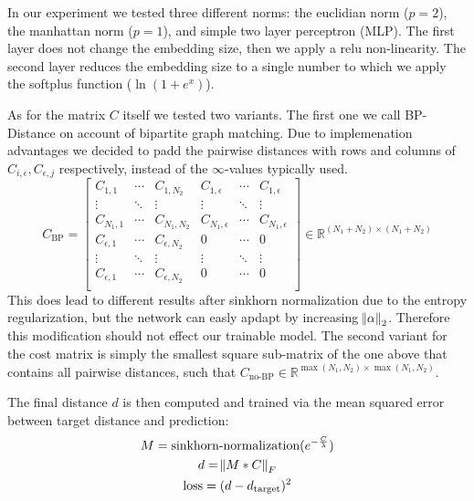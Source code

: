 In our experiment we tested three different norms: the euclidian norm ($p=2$), the manhattan norm ($p=1$), and simple two layer perceptron (MLP). The first layer does not change the embedding size, then we apply a relu non-linearity. The second layer reduces the embedding size to a single number to which we apply the softplus function ($\ln(1 + e^x)$).

As for the matrix $C$ itself we tested two variants. The first one we call BP-Distance on account of bipartite graph matching. Due to implemenation advantages we decided to padd the pairwise distances with rows and columns of $C_{i, \epsilon}, C_{\epsilon, j}$ respectively, instead of the $\infty$-values typically used.
\begin{equation}
     C_\text{BP}=
          \left[
          \begin{array}{ccc|ccc}
               C_{1,1} & \dotsi & C_{1, N_2} & C_{1, \epsilon} & \dotsi & C_{1, \epsilon} \\
               \vdots & \ddots & \vdots & \vdots & \ddots & \vdots \\
               C_{N_1, 1} & \dotsi & C_{N_1, N_2} & C_{N_1, \epsilon} & \dotsi & C_{N_1, \epsilon} \\
               \hline
               C_{\epsilon, 1} & \dotsi & C_{\epsilon, N_2} & 0 & \dotsi & 0 \\
               \vdots & \ddots & \vdots & \vdots & \ddots & \vdots \\
               C_{\epsilon, 1} & \dotsi & C_{\epsilon, N_2} & 0 & \dotsi & 0 \\
          \end{array}
          \right]
     \in \mathbb{R}^{(N_1 + N_2) \times (N_1 + N_2)}
\end{equation}
This does lead to different results after sinkhorn normalization due to the entropy regularization, but the network can easly apdapt by increasing $\norm{\alpha}_2$. Therefore this modification should not effect our trainable model. The second variant for the cost matrix is simply the smallest square sub-matrix of the one above that contains all pairwise distances, such that $C_\text{no-BP} \in \mathbb{R}^{\max({N_1, N_2}) \times \max({N_1, N_2})}$.

The final distance $d$ is then computed and trained via the mean squared error between target distance and prediction:
\begin{equation}
     \begin{gathered}
          M = \text{sinkhorn-normalization}(e^{-\frac{C}{\lambda}}) \\
          d = \norm{M * C}_F \\
          \text{loss} = (d - d_\text{target})^2
     \end{gathered}
\end{equation}


